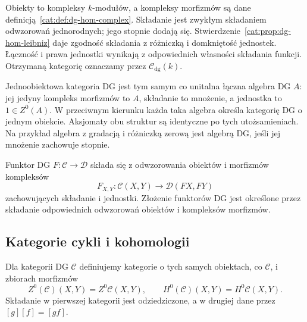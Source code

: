 \begin{przyklad}\label{cat:ex:dg-complexes}
Obiekty to kompleksy $k$-modułów, a kompleksy morfizmów są dane definicją~\ref{cat:def:dg-hom-complex}. Składanie jest zwykłym składaniem odwzorowań jednorodnych; jego stopnie dodają się. Stwierdzenie~\ref{cat:prop:dg-hom-leibniz} daje zgodność składania z różniczką i domkniętość jednostek. Łączność i prawa jednostki wynikają z odpowiednich własności składania funkcji. Otrzymaną kategorię oznaczamy przez $\mathcal{C}_{\mathrm{dg}}(k)$.
\end{przyklad}

\begin{przyklad}\label{cat:ex:dg-one-object}
Jednoobiektowa kategoria DG jest tym samym co unitalna łączna algebra DG $A$: jej jedyny kompleks morfizmów to $A$, składanie to mnożenie, a jednostka to $1\in Z^0(A)$. W przeciwnym kierunku każda taka algebra określa kategorię DG o jednym obiekcie. Aksjomaty obu struktur są identyczne po tych utożsamieniach. Na przykład algebra z gradacją i różniczką zerową jest algebrą DG, jeśli jej mnożenie zachowuje stopnie.
\end{przyklad}

\begin{definicja}[Funktor DG]\label{cat:def:dg-functor}
Funktor DG $F:\mathcal C\to\mathcal D$ składa się z odwzorowania obiektów i morfizmów kompleksów
\[
 F_{X,Y}:\mathcal C(X,Y)\longrightarrow\mathcal D(FX,FY)
\]
zachowujących składanie i jednostki. Złożenie funktorów DG jest określone przez składanie odpowiednich odwzorowań obiektów i kompleksów morfizmów.
\end{definicja}

\subsection{Kategorie cykli i kohomologii}

\begin{definicja}\label{cat:def:dg-h-zero}
Dla kategorii DG $\mathcal C$ definiujemy kategorie o tych samych obiektach, co $\mathcal C$, i zbiorach morfizmów
\[
 Z^0(\mathcal C)(X,Y)=Z^0\mathcal C(X,Y),\qquad
 H^0(\mathcal C)(X,Y)=H^0\mathcal C(X,Y).
\]
Składanie w pierwszej kategorii jest odziedziczone, a w drugiej dane przez $[g][f]=[gf]$.
\end{definicja}

